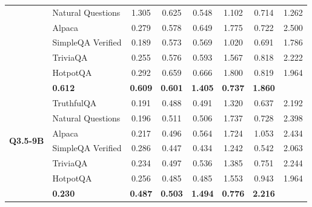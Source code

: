 \begin{table}[ht]
\begin{tabular}{ll cccccc}
        & Natural Questions \cite{kwiatkowski2019natural} & 1.305 & 0.625 & 0.548 & 1.102 & 0.714 & 1.262 \\
        & Alpaca \cite{taori2023stanford-alpaca} & 0.279 & 0.578 & 0.649 & 1.775 & 0.722 & 2.500 \\
        & SimpleQA Verified \cite{haas_simpleqa_2026} & 0.189 & 0.573 & 0.569 & 1.020 & 0.691 & 1.786 \\
        & TriviaQA \cite{joshi2017triviaqa} & 0.255 & 0.576 & 0.593 & 1.567 & 0.818 & 2.222 \\
        & HotpotQA \cite{yang2018hotpotqa} & 0.292 & 0.659 & 0.666 & 1.800 & 0.819 & 1.964 \\
        \rowcolor[gray]{.95} \multicolumn{2}{r}{\textbf{Total SGS}} & \textbf{0.612} & \textbf{0.609} & \textbf{0.601} & \textbf{1.405} & \textbf{0.737} & \textbf{1.860} \\
        \midrule
        \multirow{6}{*}{\textbf{Q3.5-9B}}
        & TruthfulQA \cite{lin2022truthfulqa} & 0.191 & 0.488 & 0.491 & 1.320 & 0.637 & 2.192 \\
        & Natural Questions \cite{kwiatkowski2019natural} & 0.196 & 0.511 & 0.506 & 1.737 & 0.728 & 2.398 \\
        & Alpaca \cite{taori2023stanford-alpaca} & 0.217 & 0.496 & 0.564 & 1.724 & 1.053 & 2.434 \\
        & SimpleQA Verified \cite{haas_simpleqa_2026} & 0.286 & 0.447 & 0.434 & 1.242 & 0.542 & 2.063 \\
        & TriviaQA \cite{joshi2017triviaqa} & 0.234 & 0.497 & 0.536 & 1.385 & 0.751 & 2.244 \\
        & HotpotQA \cite{yang2018hotpotqa} & 0.256 & 0.485 & 0.485 & 1.553 & 0.943 & 1.964 \\
        \rowcolor[gray]{.95} \multicolumn{2}{r}{\textbf{Total SGS}} & \textbf{0.230} & \textbf{0.487} & \textbf{0.503} & \textbf{1.494} & \textbf{0.776} & \textbf{2.216} \\
        \bottomrule
    \end{tabular}
\end{table}